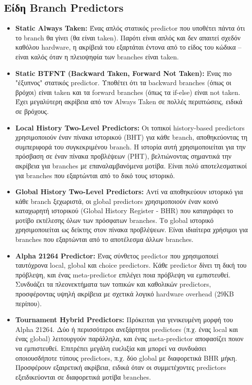 \documentclass{article}
\begin{document}
\subsection*{Είδη Branch Predictors}

\begin{itemize} \item \textbf{Static Always Taken:} Ένας απλός στατικός predictor που υποθέτει πάντα ότι το branch θα γίνει (θα είναι taken). Παρότι είναι απλός και δεν απαιτεί σχεδόν καθόλου hardware, η ακρίβειά του εξαρτάται έντονα από το είδος του κώδικα – είναι καλός όταν η πλειοψηφία των branches είναι taken.

\item \textbf{Static BTFNT (Backward Taken, Forward Not Taken):}
Ένας πιο "έξυπνος" στατικός predictor. Υποθέτει ότι τα backward branches (όπως οι βρόχοι) είναι taken και τα forward branches (όπως τα if-else) είναι not taken. Έχει μεγαλύτερη ακρίβεια από τον Always Taken σε πολλές περιπτώσεις, ειδικά σε βρόχους.

\item \textbf{Local History Two-Level Predictors:}
Οι τοπικοί history-based predictors χρησιμοποιούν έναν πίνακα ιστορικού (BHT) για κάθε branch, αποθηκεύοντας τη συμπεριφορά του συγκεκριμένου branch. Η ιστορία αυτή χρησιμοποιείται για την πρόσβαση σε έναν πίνακα προβλέψεων (PHT), βελτιώνοντας σημαντικά την ακρίβεια για branches με επαναλαμβανόμενα μοτίβα. Είναι πολύ αποτελεσματικοί για branches που εξαρτώνται από το δικό τους ιστορικό.

\item \textbf{Global History Two-Level Predictors:}
Αντί να αποθηκεύουν ιστορικό για κάθε branch ξεχωριστά, οι global predictors χρησιμοποιούν έναν κοινό καταχωρητή ιστορικού (Global History Register - BHR) που καταγράφει το μοτίβο εκτέλεσης όλων των πρόσφατων branches. Το global ιστορικό χρησιμοποιείται ως δείκτης στον πίνακα προβλέψεων. Είναι ιδιαίτερα χρήσιμοι για branches που εξαρτώνται από το αποτέλεσμα άλλων branches.

\item \textbf{Alpha 21264 Predictor:}
Ένας σύνθετος predictor που χρησιμοποιεί ταυτόχρονα local, global και choice predictors. Κάθε predictor δίνει τη δική του πρόβλεψη, και ένας meta-predictor επιλέγει ποια πρόβλεψη να εμπιστευθεί. Συνδυάζει τα πλεονεκτήματα των τοπικών και καθολικών predictors, προσφέροντας υψηλή ακρίβεια με σχετικά λογικό hardware overhead (29KB περίπου).

\item \textbf{Tournament Hybrid Predictors:}
Πρόκειται για γενικευμένη μορφή του Alpha 21264. Δύο ή περισσότεροι ανεξάρτητοι predictors (π.χ. ένας local και ένας global) λειτουργούν παράλληλα, και ένας meta-predictor αποφασίζει ποιον να εμπιστευθεί. Επιτρέπει μεγάλη ευελιξία και μπορεί να συνδυάσει οποιουσδήποτε τύπους predictors, π.χ. δύο global με διαφορετικά BHR μήκη. Προσφέρουν εξαιρετική ακρίβεια, ειδικά όταν οι συμμετέχοντες predictors εξειδικεύονται σε διαφορετικά μοτίβα branches.
\end{itemize}
\end{document}
